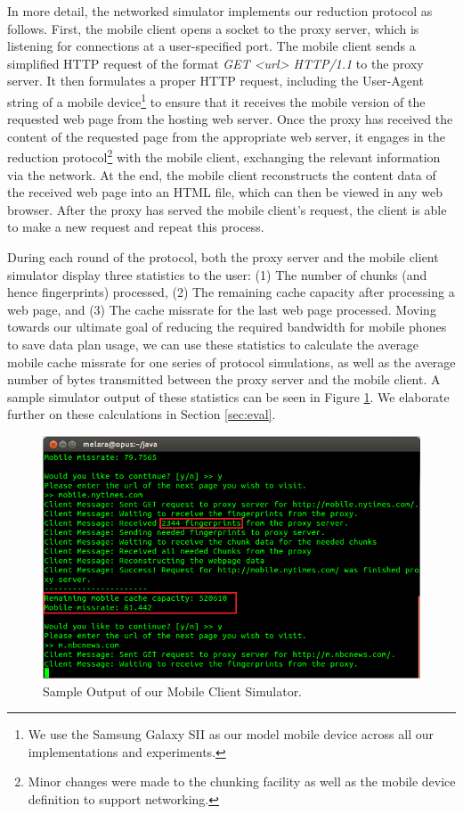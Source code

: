 In more detail, the networked simulator implements our reduction protocol as follows. First, the mobile client opens a socket to the proxy server, which is listening for connections at a user-specified port. The mobile client sends a simplified HTTP request of the format \emph{GET <url> HTTP/1.1} to the proxy server. It then formulates a proper HTTP request, including the User-Agent string of a mobile device\footnote{We use the Samsung Galaxy SII as our model mobile device across all our implementations and experiments.} to ensure that it receives the mobile version of the requested web page from the hosting web server. Once the proxy has received the content of the requested page from the appropriate web server, it engages in the reduction protocol\footnote{Minor changes were made to the chunking facility as well as the mobile device definition to support networking.} with the mobile client, exchanging the relevant information via the network. At the end, the mobile client reconstructs the content data of the received web page into an HTML file, which can then be viewed in any web browser. After the proxy has served the mobile client's request, the client is able to make a new request and repeat this process.

During each round of the protocol, both the proxy server and the mobile client simulator display three statistics to the user: (1) The number of chunks (and hence fingerprints) processed, (2) The remaining cache capacity after processing a web page, and (3) The cache missrate for the last web page processed. Moving towards our ultimate goal of reducing the required bandwidth for mobile phones to save data plan usage, we can use these statistics to calculate the average mobile cache missrate for one series of protocol simulations, as well as the average number of bytes transmitted between the proxy server and the mobile client. A sample simulator output of these statistics can be seen in Figure \ref{fig:mobsim_output}. We elaborate further on these calculations in Section \ref{sec:eval}.

\begin{figure}[h] 
\centering \includegraphics[scale=0.70]{images/mobilesim_output.png}
\caption{Sample Output of our Mobile Client Simulator.}
\label{fig:mobsim_output}
\end{figure}

